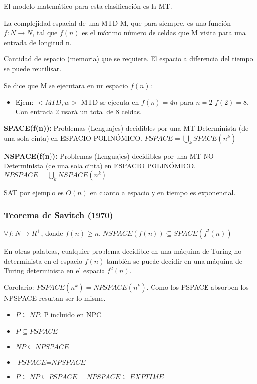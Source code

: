 El modelo matemático para esta clasificación es la MT.

La complejidad espacial de una MTD M, que para siempre, es una función $f: N \rightarrow N$, tal que $f(n)$ es el máximo número de celdas que M visita para una entrada de longitud n.

Cantidad de espacio (memoria) que se requiere. El espacio a diferencia del tiempo se puede reutilizar.

Se dice que M se ejecutara en un espacio $f(n)$:
\begin{itemize}
  \item Ejem: $<MTD, w>$ MTD se ejecuta en $f(n)=4n$ para $n=2$ $f(2)=8$. Con entrada 2 usará un total de 8 celdas. 
\end{itemize}

\textbf{SPACE(f(n)):} Problemas (Lenguajes) decidibles por una MT Determinista (de una sola cinta) en ESPACIO POLINÓMICO. $PSPACE=\bigcup_k SPACE(n^k)$

\textbf{NSPACE(f(n)):} Problemas (Lenguajes) decidibles por una MT NO Determinista (de una sola cinta) en ESPACIO POLINÓMICO. $NPSPACE=\bigcup_k NSPACE(n^k)$

SAT por ejemplo es $O(n)$ en cuanto a espacio y en tiempo es exponencial.

\subsubsection{Teorema de Savitch (1970)}
$\forall f: N \rightarrow R^+$, donde $f(n)\geq n$. $\textit{NSPACE}(f(n)) \subseteq \textit{SPACE}(f^2(n))$

En otras palabras, cualquier problema decidible en una máquina de Turing no determinista en el espacio $f(n)$ también se puede decidir en una máquina de Turing determinista en el espacio $f^2(n)$.

Corolario: $\textit{PSPACE}(n^k)=\textit{NPSPACE}(n^k)$. Como los PSPACE absorben los NPSPACE resultan ser lo mismo.
\begin{itemize}
  \item $P \subseteq NP$. P incluido en NPC
  \item $P \subseteq \textit{PSPACE}$
  \item $NP \subseteq \textit{NPSPACE}$
  \item $\textit{PSPACE} = \textit{NPSPACE}$
  \item $P \subseteq NP \subseteq \textit{PSPACE}=\textit{NPSPACE} \subseteq \textit{EXPTIME}$
\end{itemize}